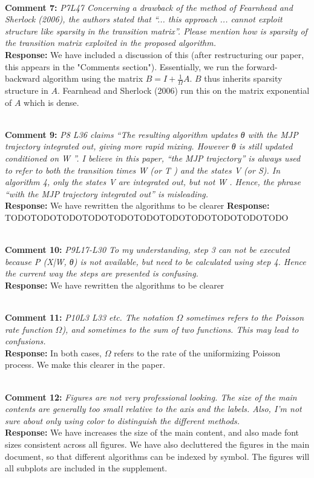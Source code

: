 \documentclass[11pt]{article}
\newcommand{\rev}[2]{\textbf{Comment #1: }\emph{#2}}
\newcommand{\resp}{\textbf{Response: }}
\begin{document}
~\\
\noindent \rev{7}{P7L47 Concerning a drawback of the method of Fearnhead and Sherlock (2006), the authors stated that “... this approach ... cannot exploit structure like sparsity in the transition matrix”. Please mention how is sparsity of the transition matrix exploited in the proposed algorithm.}
\\
\resp{We have included a discussion of this (after restructuring our paper, this appears in the "Comments section"). Essentially, we run the forward-backward algorithm using the matrix $B = I + \frac{1}{\Omega}A$. $B$ thus inherits sparsity structure in $A$. Fearnhead and Sherlock (2006) run this on the matrix exponential of $A$ which is dense.}

~\\
\rev{9}{P8 L36 claims “The resulting algorithm updates θ with the MJP trajectory integrated out, giving more rapid mixing. However θ is still updated conditioned on W ”. I believe in this paper, “the MJP trajectory” is always used to refer to both the transition times W (or T ) and the states V (or S). In algorithm 4, only the states V are integrated out, but not W . Hence, the phrase “with the MJP trajectory integrated out” is misleading.}\\
\resp{We have rewritten the algorithms to be clearer}
\resp{TODOTODOTODOTODOTODOTODOTODOTODOTODOTODOTODO}

~\\
\rev{10}{P9L17-L30 To my understanding, step 3 can not be executed because P (X|W, θ) is not available, but need to be calculated using step 4. Hence the current way the steps are presented is confusing.} \\
\resp{We have rewritten the algorithms to be clearer}

~\\
\rev{11}{P10L3 L33 etc. The notation $\Omega$ sometimes refers to the Poisson rate function $\Omega$), and sometimes to the sum of two functions. This may lead to confusions.}
~\\ 
\resp{In both cases, $\Omega$ refers to the rate of the uniformizing Poisson process. We make this clearer in the paper}. 

~\\ 
\rev{12}{Figures are not very professional looking. The size of the main contents are generally too small relative to the axis and the labels. Also, I’m not sure about only using color to distinguish the different methods.}\\
\resp{We have increases the size of the main content, and also made font sizes consistent across all figures. We have also decluttered the figures in the main document, so that different algorithms can be indexed by symbol. The figures will all subplots are included in the supplement.} 
\end{document}
